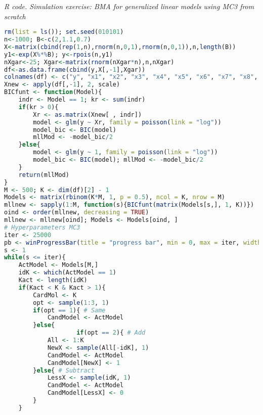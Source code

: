\begin{tcolorbox}[enhanced,width=4.67in,center upper,
	fontupper=\large\bfseries,drop shadow southwest,sharp corners]
	\textit{R code. Simulation exercise: BMA for generalized linear models using MC3 from scratch}
	\begin{VF}
		\begin{lstlisting}[language=R]
rm(list = ls()); set.seed(010101)
n<-1000; B<-c(2,1.1,0.7)
X<-matrix(cbind(rep(1,n),rnorm(n,0,1),rnorm(n,0,1)),n,length(B))
y1<-exp(X%*%B); y<-rpois(n,y1)
nXgar<-25; Xgar<-matrix(rnorm(nXgar*n),n,nXgar)
df<-as.data.frame(cbind(y,X[,-1],Xgar))
colnames(df) <- c("y", "x1", "x2", "x3", "x4", "x5", "x6", "x7", "x8", "x9", "x10", "x11", "x12", "x13", "x14", "x15", "x16", "x17", "x18", "x19", "x20", "x21", "x22", "x23", "x24", "x25", "x26", "x27")
Xnew <- apply(df[,-1], 2, scale)
BICfunt <- function(Model){
	indr <- Model == 1; kr <- sum(indr)
	if(kr > 0){
		Xr <- as.matrix(Xnew[ , indr])
		model <- glm(y ~ Xr, family = poisson(link = "log"))
		model_bic <- BIC(model)
		mllMod <- -model_bic/2
	}else{
		model <- glm(y ~ 1, family = poisson(link = "log"))
		model_bic <- BIC(model); mllMod <- -model_bic/2
	}
	return(mllMod)
}
M <- 500; K <- dim(df)[2] - 1
Models <- matrix(rbinom(K*M, 1, p = 0.5), ncol = K, nrow = M)
mllnew <- sapply(1:M, function(s){BICfunt(matrix(Models[s,], 1, K))})
oind <- order(mllnew, decreasing = TRUE)
mllnew <- mllnew[oind]; Models <- Models[oind, ]
# Hyperparameters MC3
iter <- 25000
pb <- winProgressBar(title = "progress bar", min = 0, max = iter, width = 300)
s <- 1
while(s <= iter){
	ActModel <- Models[M,]
	idK <- which(ActModel == 1)
	Kact <- length(idK)
	if(Kact < K & Kact > 1){
		CardMol <- K
		opt <- sample(1:3, 1)
		if(opt == 1){ # Same
			CandModel <- ActModel
		}else{
					if(opt == 2){ # Add
			All <- 1:K
			NewX <- sample(All[-idK], 1)
			CandModel <- ActModel
			CandModel[NewX] <- 1
		}else{ # Subtract
			LessX <- sample(idK, 1)
			CandModel <- ActModel
			CandModel[LessX] <- 0
		}
	}
\end{lstlisting}
	\end{VF}
\end{tcolorbox} 

